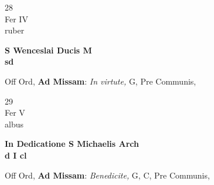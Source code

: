 \documentclass[10pt, openany]{book}
\begin{document}
        \begin{center}
            \begin{minipage}{3.5in}
                \vspace{2em}
                \begin{minipage}{0.5in}
                    {\Huge 28} \\
                    {\normalsize Fer IV} \\
                    {\normalsize ruber}
                \end{minipage}
                \begin{minipage}{3.0in}
                    \textbf{ \large S Wenceslai Ducis M \\
                    \textnormal{\normalsize sd}} \\ 
                \end{minipage}
                \begin{justify}Off Ord, \textbf{Ad Missam}: \textit{In virtute,} G, Pre Communis,  
                \end{justify}
            \end{minipage}
        \end{center}
    
        \begin{center}
            \begin{minipage}{3.5in}
                \vspace{2em}
                \begin{minipage}{0.5in}
                    {\Huge 29} \\
                    {\normalsize Fer V} \\
                    {\normalsize albus}
                \end{minipage}
                \begin{minipage}{3.0in}
                    \textbf{ \large In Dedicatione S Michaelis Arch \\
                    \textnormal{\normalsize d I cl}} \\ 
                \end{minipage}
                \begin{justify}Off Ord, \textbf{Ad Missam}: \textit{Benedicite,} G, C, Pre Communis,  
                \end{justify}
            \end{minipage}
        \end{center}
    
\end{document}
